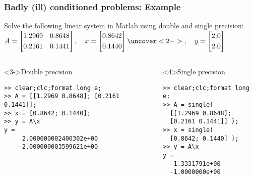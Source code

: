 \documentclass[11pt,table,final,fleqn,xcolor={usenames,dvipsnames}]{beamer}
\begin{document}
\begin{frame}[fragile]
  \frametitle{Badly (ill) conditioned problems: Example}
  Solve the following linear system in Matlab using double and single precision:\\
  $ A = 
      \left[\begin{aligned}
       1.2969 & & 0.8648 \\%
       0.2161 & & 0.1441
      \end{aligned}\right], \quad 
     x = \left[\begin{aligned}
       0.8642  \\%
       0.1440 
     \end{aligned}\right]
     \uncover<2->{, \quad 
     y = \left[\begin{aligned}
       2.0 \\%
       2.0 
     \end{aligned}\right]} $
\begin{columns}[T]
  \begin{block}<3->{Double precision}
    \begin{lstlisting}
>> clear;clc;format long e;
>> A = [[1.2969 0.8648]; [0.2161 0.1441]];
>> x = [0.8642; 0.1440];
>> y = A\x
y =
     2.000000002400302e+00
    -2.000000003599621e+00
    \end{lstlisting}
  \end{block}
  \pause 
    \begin{block}<4>{Single precision}
      \begin{lstlisting}
>> clear;clc;format long e;
>> A = single(
  [[1.2969 0.8648];
  [0.2161 0.1441]] );
>> x = single(
  [0.8642; 0.1440] );
>> y = A\x
y =
   1.3331791e+00
  -1.0000000e+00
    \end{lstlisting}
  \end{block}
\end{columns}
\end{frame}

\end{document}
